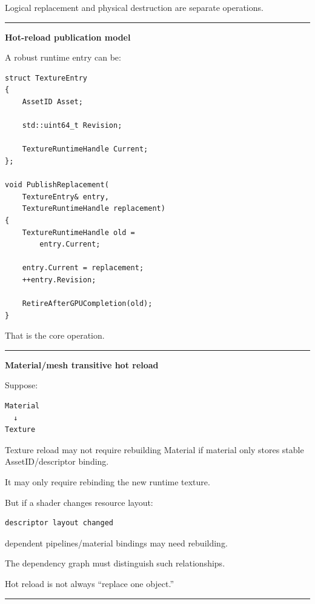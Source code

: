Logical replacement and physical destruction are separate operations.

\begin{center}\rule{0.5\linewidth}{0.5pt}\end{center}

\textbf{Hot-reload publication model}

A robust runtime entry can be:

\begin{verbatim}
struct TextureEntry
{
    AssetID Asset;

    std::uint64_t Revision;

    TextureRuntimeHandle Current;
};

void PublishReplacement(
    TextureEntry& entry,
    TextureRuntimeHandle replacement)
{
    TextureRuntimeHandle old =
        entry.Current;

    entry.Current = replacement;
    ++entry.Revision;

    RetireAfterGPUCompletion(old);
}
\end{verbatim}

That is the core operation.

\begin{center}\rule{0.5\linewidth}{0.5pt}\end{center}

\textbf{Material/mesh transitive hot reload}

Suppose:

\begin{verbatim}
Material
  ↓
Texture
\end{verbatim}

Texture reload may not require rebuilding Material if material only stores stable AssetID/descriptor binding.

It may only require rebinding the new runtime texture.

But if a shader changes resource layout:

\begin{verbatim}
descriptor layout changed
\end{verbatim}

dependent pipelines/material bindings may need rebuilding.

The dependency graph must distinguish such relationships.

Hot reload is not always ``replace one object.''

\begin{center}\rule{0.5\linewidth}{0.5pt}\end{center}

